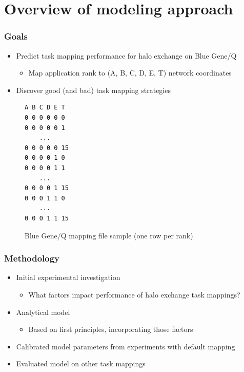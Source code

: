\documentclass{beamer}
\begin{document}
\section{Overview of modeling approach}
\begin{frame}[fragile]
\frametitle{Goals}
\begin{itemize}
  \item Predict task mapping performance for halo exchange on Blue Gene/Q
  \begin{itemize}
    \item Map application rank to (A, B, C, D, E, T) network coordinates
  \end{itemize}
  \item Discover good (and bad) task mapping strategies
\end{itemize}
\vspace{-1em}
\begin{figure}
  \centering
  \caption{Blue Gene/Q mapping file sample (one row per rank)}
  \begin{lstlisting}[basicstyle=\footnotesize\ttfamily, frame=lines,columns=fixed]
A B C D E T
0 0 0 0 0 0
0 0 0 0 0 1
    ...
0 0 0 0 0 15
0 0 0 0 1 0
0 0 0 0 1 1
    ...
0 0 0 0 1 15
0 0 0 1 1 0
    ...
0 0 0 1 1 15
  \end{lstlisting}
\end{figure}
\end{frame}

\begin{frame}
\frametitle{Methodology}
\begin{itemize}
  \item Initial experimental investigation
  \begin{itemize}
    \item What factors impact performance of halo exchange task mappings?
  \end{itemize}
  \item Analytical model 
  \begin{itemize}
    \item Based on first principles, incorporating those factors
  \end{itemize}
  \item Calibrated model parameters from experiments with default mapping
  \item Evaluated model on other task mappings
\end{itemize}
\end{frame}
\end{document}
